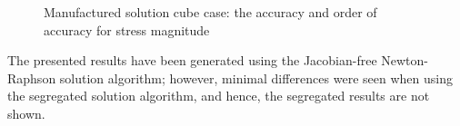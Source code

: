 \documentclass[sn-mathphys,Numbered]{sn-jnl}%
\begin{document}
\begin{figure}[htbp]
	\centering
	\caption{Manufactured solution cube case: the accuracy and order of accuracy for stress magnitude}
	\label{fig:mms_stress_accuracy}
\end{figure}

The presented results have been generated using the Jacobian-free Newton-Raphson solution algorithm; however, minimal differences were seen when using the segregated solution algorithm, and hence, the segregated results are not shown.

\end{document}
